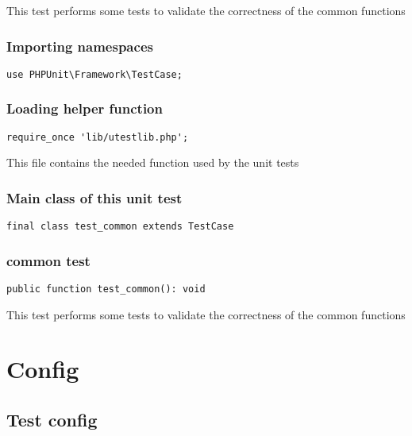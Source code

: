 \documentclass[a4paper]{article}
\begin{document}
This test performs some tests to validate the correctness
of the common functions

\hypertarget{toc99}{}
\subsubsection{Importing namespaces}

\begin{lstlisting}
use PHPUnit\Framework\TestCase;
\end{lstlisting}

\hypertarget{toc100}{}
\subsubsection{Loading helper function}

\begin{lstlisting}
require_once 'lib/utestlib.php';
\end{lstlisting}

This file contains the needed function used by the unit tests

\hypertarget{toc101}{}
\subsubsection{Main class of this unit test}

\begin{lstlisting}
final class test_common extends TestCase
\end{lstlisting}

\hypertarget{toc102}{}
\subsubsection{common test}

\begin{lstlisting}
public function test_common(): void
\end{lstlisting}

This test performs some tests to validate the correctness
of the common functions


\hypertarget{toc103}{}
\section{Config}

\hypertarget{toc104}{}
\subsection{Test config}
\end{document}
